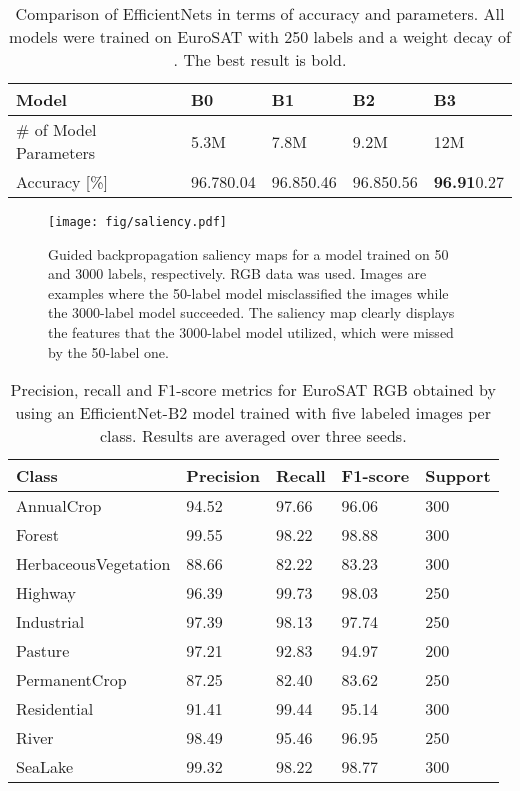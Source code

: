 \documentclass[journal]{IEEEtran}
\newcommand{\bt}[1]{\textbf{#1}}
\begin{document}
\begin{table}
\caption{Comparison of EfficientNets in terms of accuracy and parameters. All models were trained on EuroSAT with 250 labels and a weight decay of . The best result is bold.}
\begin{center}
 {\tabulinesep=0.8mm
\setlength\tabcolsep{2pt}
\begin{tabu} { |X[2m]|| X[1cm] | X[1cm] | X[1cm]| X[1cm] |}
 \hline
  Model & B0 & B1 & B2 & B3 \\ \hline
  \# of Model Parameters & 5.3M & 7.8M & 9.2M & 12M \\ \hline
  Accuracy [\%] & 96.780.04  & 96.850.46 & 96.850.56 & \bt{96.91}0.27 \\ \hline
\end{tabu}}
\label{table:model}
\end{center}
\end{table}


\begin{figure}[ht]
\centering
\texttt{[image: fig/saliency.pdf]}
\caption{Guided backpropagation saliency maps for a model trained on 50 and 3000 labels, respectively. RGB data was used. Images are examples where the 50-label model misclassified the images while the 3000-label model succeeded. The saliency map clearly displays the features that the 3000-label model utilized, which were missed by the 50-label one.}
\label{fig: saliency}
\end{figure}

\begin{table}
\caption{Precision, recall and F1-score metrics for EuroSAT RGB obtained by using an EfficientNet-B2 model trained with five labeled images per class. Results are averaged over three seeds.}
\begin{center}
 {\tabulinesep=0.5mm
\setlength\tabcolsep{2pt}
\begin{tabu} { |X[2]|| X[1c] | X[1c] | X[1c] | X[1c]|}
\hline
Class  & Precision & Recall & F1-score & Support \\ \hline
AnnualCrop             & 94.52  & 97.66 & 96.06 & 300 \\ \hline
Forest                 & 99.55  & 98.22 & 98.88 & 300 \\ \hline
HerbaceousVegetation   & 88.66  & 82.22 & 83.23 & 300 \\ \hline
Highway                & 96.39  & 99.73 & 98.03 & 250 \\ \hline
Industrial             & 97.39  & 98.13 & 97.74 & 250 \\ \hline
Pasture                & 97.21  & 92.83 & 94.97 & 200 \\ \hline
PermanentCrop          & 87.25  & 82.40 & 83.62 & 250 \\ \hline
Residential            & 91.41  & 99.44 & 95.14 & 300 \\ \hline
River                  & 98.49  & 95.46 & 96.95 & 250 \\ \hline
SeaLake                & 99.32  & 98.22 & 98.77 & 300 \\ \hline
\end{tabu}}
\label{table:EuroSAT_RGBMetrics}
\end{center}
\end{table}
\end{document}
